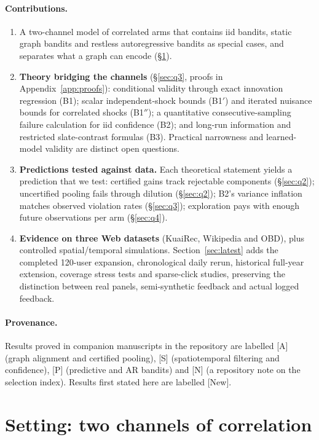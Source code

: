 \documentclass[11pt]{article}
\theoremstyle{definition}
\theoremstyle{remark}
\newcommand{\src}[1]{\textsf{[#1]}}
\begin{document}
\paragraph{Contributions.}
\begin{enumerate}
\item A two-channel model of correlated arms that contains iid bandits, static graph bandits and restless autoregressive bandits as special cases, and separates what a graph can encode (\S\ref{sec:model}).
\item \textbf{Theory bridging the channels} (\S\ref{sec:q3}, proofs in Appendix~\ref{app:proofs}): conditional validity through exact innovation regression (B1); scalar independent-shock bounds (B1$'$) and iterated nuisance bounds for correlated shocks (B1$''$); a quantitative consecutive-sampling failure calculation for iid confidence (B2); and long-run information and restricted slate-contrast formulas (B3). Practical narrowness and learned-model validity are distinct open questions.
\item \textbf{Predictions tested against data.} Each theoretical statement yields a prediction that we test: certified gains track rejectable components (\S\ref{sec:q2}); uncertified pooling fails through dilution (\S\ref{sec:q2}); B2's variance inflation matches observed violation rates (\S\ref{sec:q3}); exploration pays with enough future observations per arm (\S\ref{sec:q4}).
\item \textbf{Evidence on three Web datasets} (KuaiRec, Wikipedia and OBD), plus controlled spatial/temporal simulations. Section~\ref{sec:latest} adds the completed 120-user expansion, chronological daily rerun, historical full-year extension, coverage stress tests and sparse-click studies, preserving the distinction between real panels, semi-synthetic feedback and actual logged feedback.
\end{enumerate}

\paragraph{Provenance.} Results proved in companion manuscripts in the repository are labelled \src{A} (graph alignment and certified pooling), \src{S} (spatiotemporal filtering and confidence), \src{P} (predictive and AR bandits) and \src{N} (a repository note on the selection index). Results first stated here are labelled \src{New}.

\section{Setting: two channels of correlation}\label{sec:model}
\end{document}
